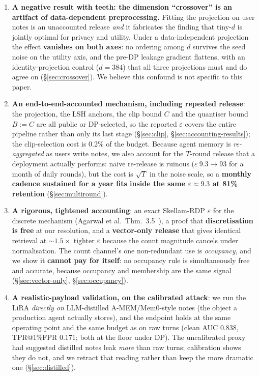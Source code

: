 \documentclass[pdflatex,sn-mathphys-num,iicol]{sn-jnl}
\theoremstyle{thmstyleone}%
\theoremstyle{thmstyletwo}%
\theoremstyle{thmstylethree}%
\newcommand{\eps}{\varepsilon}
\newcommand{\secref}[1]{\S\ref{#1}}
\begin{document}
\begin{enumerate}
  \item \textbf{A negative result with teeth: the dimension ``crossover'' is an
    artifact of data-dependent preprocessing.} Fitting the projection on user
    notes is an unaccounted release \emph{and} it fabricates the finding that
    tiny-$d$ is jointly optimal for privacy and utility. Under a data-independent
    projection the effect \textbf{vanishes on both axes}: no ordering among $d$
    survives the seed noise on the utility axis, and the pre-DP leakage gradient
    flattens, with an identity-projection control ($d = 384$) that all three
    projections must and do agree on (\secref{sec:crossover}). We believe this
    confound is not specific to this paper.

  \item \textbf{An end-to-end-accounted mechanism, including repeated release}:
    the projection, the LSH anchors, the clip bound $C$ and the quantiser bound
    $B := C$ are all public or DP-selected, so the reported $\eps$ covers the
    entire pipeline rather than only its last stage (\secref{sec:clip},
    \secref{sec:accounting-results}); the clip-selection cost is 0.2\% of the
    budget. Because agent memory is \emph{re-aggregated} as users write notes, we
    also account for the $T$-round release that a deployment actually performs:
    naive re-release is ruinous ($\eps\ 9.3 \to 93$ for a month of daily rounds),
    but the cost is $\sqrt{T}$ in the noise scale, so a \textbf{monthly cadence
    sustained for a year fits inside the same $\eps \approx 9.3$ at 81\%
    retention} (\secref{sec:multiround}).

  \item \textbf{A rigorous, tightened accounting}: an exact Skellam-RDP $\eps$ for
    the discrete mechanism (Agarwal et al.\ Thm.~3.5~\cite{agarwal2021skellam}), a
    proof that \textbf{discretisation is free} at our resolution, and a
    \textbf{vector-only release} that gives identical retrieval at
    ${\sim}1.5\times$ tighter $\eps$ because the count magnitude cancels under
    normalisation. The count channel's one non-redundant use is \emph{occupancy},
    and we show it \textbf{cannot pay for itself}: no occupancy rule is
    simultaneously free and accurate, because occupancy and membership are the same
    signal (\secref{sec:vector-only}, \secref{sec:occupancy}).

  \item \textbf{A realistic-payload validation, on the calibrated attack}: we run
    the LiRA \emph{directly on} LLM-distilled A-MEM/Mem0-style notes (the object
    a production agent actually stores), and the endpoint holds at the same
    operating point and the same budget as on raw turns (clean AUC $0.838$,
    TPR@1\%FPR $0.171$; both at the floor under DP). The uncalibrated proxy had
    suggested distilled notes leak \emph{more} than raw turns; calibration shows
    they do not, and we retract that reading rather than keep the more dramatic one
    (\secref{sec:distilled}).
\end{enumerate}
\end{document}
